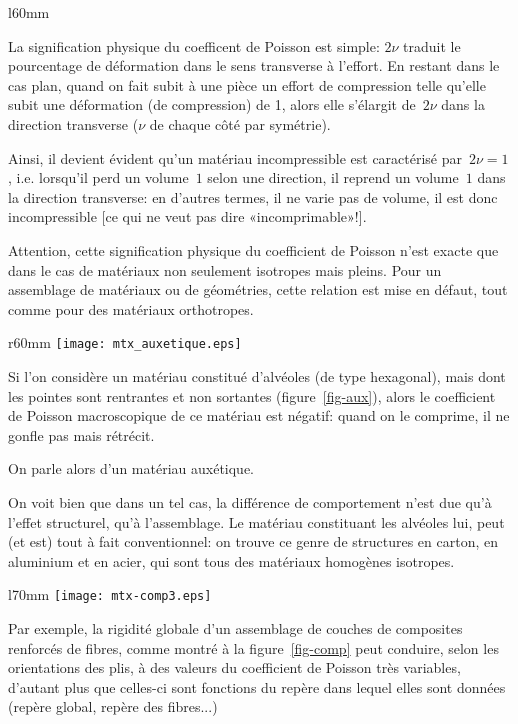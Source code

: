 \medskip
\begin{wrapfigure}{l}{60mm}
  \centering
   \hfill
  \caption{Déformation et coefficient de Poisson}
\end{wrapfigure}
La signification physique du coefficent de Poisson est simple: $2\nu$ traduit le pourcentage de déformation dans le sens transverse à l'effort. En restant dans le cas plan, quand on fait subit à une pièce un effort de compression telle qu'elle subit une déformation (de compression) de 1, alors elle s'élargit de~$2\nu$ dans la direction transverse ($\nu$ de chaque côté par symétrie).

Ainsi, il devient évident qu'un matériau incompressible est caractérisé par~$2\nu=1$, i.e. lorsqu'il perd un volume~$1$ selon une direction, il reprend un volume~$1$ dans la direction transverse: en d'autres termes, il ne varie pas de volume, il est donc incompressible [ce qui ne veut pas dire «incomprimable»!].

\medskip
Attention, cette signification physique du coefficient de Poisson n'est exacte que dans le cas de matériaux non seulement isotropes mais pleins. Pour un assemblage de matériaux ou de géométries, cette relation est mise en défaut, tout comme pour des matériaux orthotropes.

\medskip
\begin{wrapfigure}{r}{60mm}
  \centering
  \texttt{[image: mtx\_auxetique.eps]}
  \caption{Matériau auxétique}\label{fig-aux}
\end{wrapfigure}
Si l'on considère un matériau constitué d'alvéoles (de type hexagonal), mais dont les pointes sont rentrantes et non sortantes (figure~\ref{fig-aux}), alors le coefficient de Poisson macroscopique de ce matériau est négatif: quand on le comprime, il ne gonfle pas mais rétrécit.

On parle alors d'un matériau auxétique.

On voit bien que dans un tel cas, la différence de comportement n'est due qu'à l'effet structurel, qu'à l'assemblage. Le matériau constituant les alvéoles lui, peut (et est) tout à fait conventionnel: on trouve ce genre de structures en carton, en aluminium et en acier, qui sont tous des matériaux homogènes isotropes.


\medskip
\begin{wrapfigure}{l}{70mm}
  \centering
  \texttt{[image: mtx-comp3.eps]}
  \caption{Matériau composite}\label{fig-comp}
\end{wrapfigure}
Par exemple, la rigidité globale d'un assemblage de couches de composites renforcés de fibres, comme montré à la figure~\ref{fig-comp} peut conduire, selon les orientations des plis, à des valeurs du coefficient de Poisson très variables, d'autant plus que celles-ci sont fonctions du repère dans lequel elles sont données (repère global, repère des fibres...)

